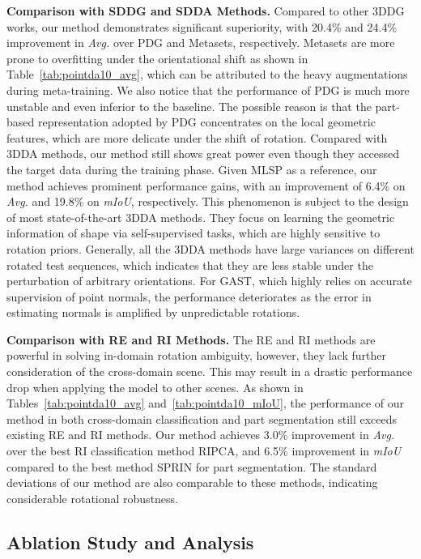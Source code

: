 \noindent\textbf{Comparison with SDDG and SDDA Methods. }
Compared to other 3DDG works, our method demonstrates significant superiority, with 20.4\% and 24.4\% improvement in \textit{Avg.} over PDG and Metasets, respectively. Metasets are more prone to overfitting under the orientational shift as shown in Table~\ref{tab:pointda10_avg}, which can be attributed to the heavy augmentations during meta-training.
We also notice that the performance of PDG is much more unstable and even inferior to the baseline.
The possible reason is that the part-based representation adopted by PDG concentrates on the local geometric features, which are more delicate under the shift of rotation.
Compared with 3DDA methods, our method still shows great power even though they accessed the target data during the training phase. Given MLSP as a reference, our method achieves prominent performance gains, with an improvement of 6.4\% on \textit{Avg.} and 19.8\% on \textit{mIoU}, respectively. This phenomenon is subject to the design of most state-of-the-art 3DDA methods. They focus on learning the geometric information of shape via self-supervised tasks, which are highly sensitive to rotation priors. Generally, all the 3DDA methods have large variances on different rotated test sequences, which indicates that they are less stable under the perturbation of arbitrary orientations. For GAST, which highly relies on accurate supervision of point normals, the performance deteriorates as the error in estimating normals is amplified by unpredictable rotations.


\noindent\textbf{Comparison with RE and RI Methods.} The RE and RI methods are powerful in solving in-domain rotation ambiguity, however, they lack further consideration of the cross-domain scene. This may result in a drastic performance drop when applying the model to other scenes. As shown in Tables~\ref{tab:pointda10_avg} and~\ref{tab:pointda10_mIoU}, the performance of our method in both cross-domain classification and part segmentation still exceeds existing RE and RI methods. Our method achieves 3.0\% improvement in \textit{Avg.} over the best RI classification method RIPCA, and 6.5\% improvement in \textit{mIoU} compared to the best method SPRIN for part segmentation. The standard deviations of our method are also comparable to these methods, indicating considerable rotational robustness.




\vspace{-1mm}
\subsection{Ablation Study and Analysis}

